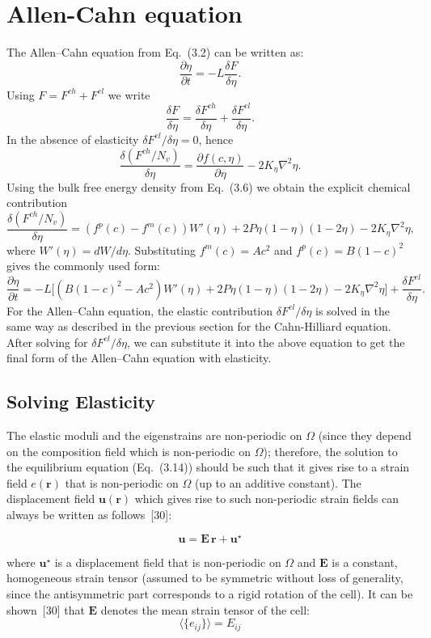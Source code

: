 \section{Allen-Cahn equation}
The Allen--Cahn equation from Eq.~(3.2) can be written as:
\[
\frac{\partial \eta}{\partial t} = -L\frac{\delta F}{\delta \eta}.
\]
Using $F=F^{ch}+F^{el}$ we write
\[
\frac{\delta F}{\delta \eta}=\frac{\delta F^{ch}}{\delta \eta}+\frac{\delta F^{el}}{\delta \eta}.
\]
In the absence of elasticity $\delta F^{el}/\delta\eta=0$, hence
\[
\frac{\delta (F^{ch}/N_v)}{\delta \eta}=\frac{\partial f(c,\eta)}{\partial \eta}-2K_{\eta}\nabla^2\eta.
\]
Using the bulk free energy density from Eq.~(3.6) we obtain the explicit chemical contribution
\[
\frac{\delta (F^{ch}/N_v)}{\delta \eta}=(f^p(c)-f^m(c))W'(\eta)+2P\eta(1-\eta)(1-2\eta)-2K_{\eta}\nabla^2\eta,
\]
where $W'(\eta)=dW/d\eta$. Substituting $f^m(c)=Ac^2$ and $f^p(c)=B(1-c)^2$ gives the commonly used form:
\[
\frac{\partial \eta}{\partial t} = -L\Big[(B(1-c)^2-Ac^2)W'(\eta)+2P\eta(1-\eta)(1-2\eta)-2K_{\eta}\nabla^2\eta\Big] + \frac{\delta F^{el}}{\delta \eta}.
\]
For the Allen--Cahn equation, the elastic contribution $\delta F^{el}/\delta \eta$ is solved in the same way as described in the previous section for the Cahn-Hilliard equation. After solving for $\delta F^{el}/\delta \eta$, we can substitute it into the above equation to get the final form of the Allen--Cahn equation with elasticity.

\subsection{Solving Elasticity}
The elastic moduli and the eigenstrains are non-periodic on $\Omega$ (since they depend on the composition field which is non-periodic on $\Omega$); therefore, the solution to the equilibrium equation (Eq.~(3.14)) should be such that it gives rise to a strain field $e(\mathbf{r})$ that is non-periodic on $\Omega$ (up to an additive constant). The displacement field $\mathbf{u}(\mathbf{r})$ which gives rise to such non-periodic strain fields can always be written as follows~[30]:

\begin{equation}
\mathbf{u}=\mathbf{E}\,\mathbf{r}+\mathbf{u}^{\star} \label{eq:disp_decomp}
\end{equation}

where $\mathbf{u}^{\star}$ is a displacement field that is non-periodic on $\Omega$ and $\mathbf{E}$ is a constant, homogeneous strain tensor (assumed to be symmetric without loss of generality, since the antisymmetric part corresponds to a rigid rotation of the cell). It can be shown~[30] that $\mathbf{E}$ denotes the mean strain tensor of the cell:
\begin{equation}
\langle \{e_{ij}\}\rangle = E_{ij}
\end{equation}

